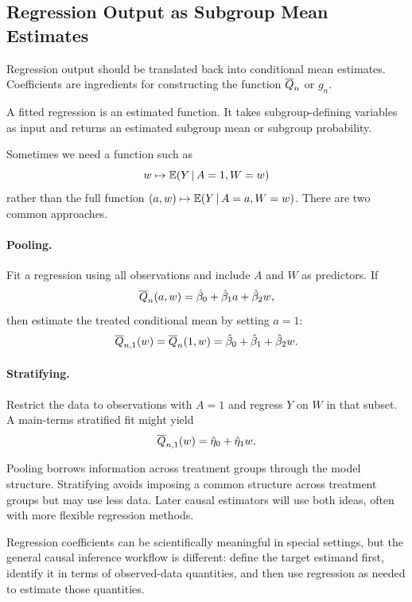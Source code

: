 \subsection{Regression Output as Subgroup Mean Estimates}

Regression output should be translated back into conditional mean estimates. Coefficients are ingredients for constructing the function $\overline{Q}_n$ or $g_n$.

\begin{keyidea}
A fitted regression is an estimated function. It takes subgroup-defining variables as input and returns an estimated subgroup mean or subgroup probability.
\end{keyidea}

Sometimes we need a function such as
\[
w\mapsto \mathbb{E}(Y\,\vert\, A=1,W=w)
\]
rather than the full function $(a,w)\mapsto \mathbb{E}(Y\,\vert\, A=a,W=w)$. There are two common approaches.

\paragraph{Pooling.}
Fit a regression using all observations and include $A$ and $W$ as predictors. If
\[
\overline{Q}_n(a,w)=\hat\beta_0+\hat\beta_1a+\hat\beta_2w,
\]
then estimate the treated conditional mean by setting $a=1$:
\[
\overline{Q}_{n,1}(w)=\overline{Q}_n(1,w)=\hat\beta_0+\hat\beta_1+\hat\beta_2w.
\]

\paragraph{Stratifying.}
Restrict the data to observations with $A=1$ and regress $Y$ on $W$ in that subset. A main-terms stratified fit might yield
\[
\overline{Q}_{n,1}(w)=\hat\eta_0+\hat\eta_1w.
\]

Pooling borrows information across treatment groups through the model structure. Stratifying avoids imposing a common structure across treatment groups but may use less data. Later causal estimators will use both ideas, often with more flexible regression methods.

\begin{remark}
Regression coefficients can be scientifically meaningful in special settings, but the general causal inference workflow is different: define the target estimand first, identify it in terms of observed-data quantities, and then use regression as needed to estimate those quantities.
\end{remark}
